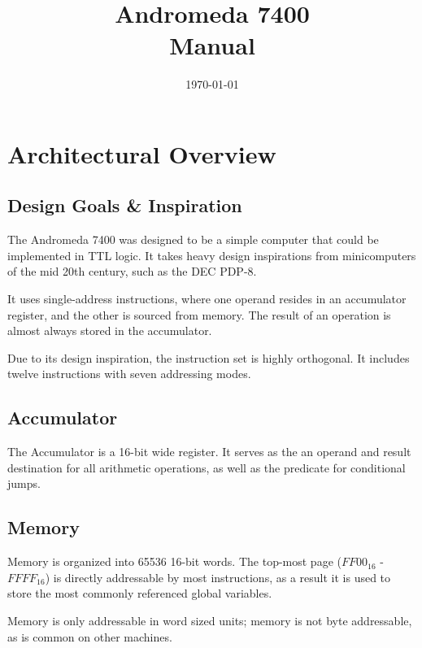 \documentclass{article}
\title{
    Andromeda 7400\\
\large Manual}
\date{\today}
\begin{document}
    \maketitle

    \pagebreak
    \tableofcontents
    \pagebreak

    \section{Architectural Overview}\label{subsec:archetctural-overview}
    \subsection{Design Goals \& Inspiration}\label{subsec:design-goals-&-inspiration}
    \par The Andromeda 7400 was designed to be a simple computer that could be implemented in TTL logic.
    It takes heavy design inspirations from minicomputers of the mid 20th century, such as the
    DEC PDP-8.
    \par It uses single-address instructions, where one operand resides in an accumulator register, and the other is
    sourced from memory.
    The result of an operation is almost always stored in the accumulator.
    \par Due to its design inspiration, the instruction set is highly orthogonal.
    It includes twelve instructions with seven addressing modes.

    \subsection{Accumulator}\label{subsec:accumulator}
    \par The Accumulator is a 16-bit wide register.
    It serves as the an operand and result destination for all arithmetic operations, as well as the predicate for conditional jumps.

    \subsection{Memory}\label{subsec:memory}
    \par Memory is organized into 65536 16-bit words.
    The top-most page ($FF00_{16}$ - $FFFF_{16}$) is directly addressable by most instructions, as a result it
    is used to store the most commonly referenced global variables.
    \par Memory is only addressable in word sized units; memory is not byte addressable, as is common on other machines.
\end{document}
